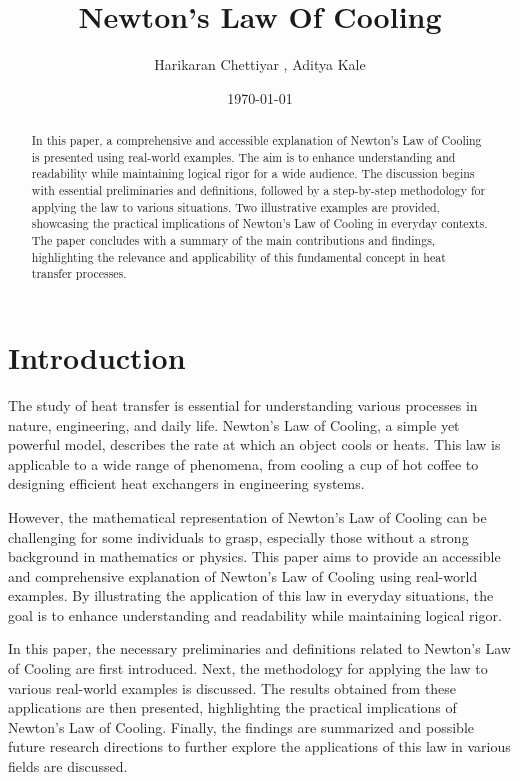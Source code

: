 \documentclass[12pt, a4paper]{article}
\title{Newton's Law Of Cooling}
\author{Harikaran Chettiyar , Aditya Kale}
\date{\today}
\begin{document}
\maketitle

\begin{abstract}
In this paper, a comprehensive and accessible explanation of Newton's Law of Cooling is presented using real-world examples. The aim is to enhance understanding and readability while maintaining logical rigor for a wide audience. The discussion begins with essential preliminaries and definitions, followed by a step-by-step methodology for applying the law to various situations. Two illustrative examples are provided, showcasing the practical implications of Newton's Law of Cooling in everyday contexts. The paper concludes with a summary of the main contributions and findings, highlighting the relevance and applicability of this fundamental concept in heat transfer processes.
\end{abstract}

\tableofcontents

\section{Introduction}
The study of heat transfer is essential for understanding various processes in nature, engineering, and daily life. Newton's Law of Cooling, a simple yet powerful model, describes the rate at which an object cools or heats. This law is applicable to a wide range of phenomena, from cooling a cup of hot coffee to designing efficient heat exchangers in engineering systems. 

\vspace{1em}

However, the mathematical representation of Newton's Law of Cooling can be challenging for some individuals to grasp, especially those without a strong background in mathematics or physics. This paper aims to provide an accessible and comprehensive explanation of Newton's Law of Cooling using real-world examples. By illustrating the application of this law in everyday situations, the goal is to enhance understanding and readability while maintaining logical rigor.

\vspace{1em}

In this paper, the necessary preliminaries and definitions related to Newton's Law of Cooling are first introduced. Next, the methodology for applying the law to various real-world examples is discussed. The results obtained from these applications are then presented, highlighting the practical implications of Newton's Law of Cooling. Finally, the findings are summarized and possible future research directions to further explore the applications of this law in various fields are discussed.
\end{document}
